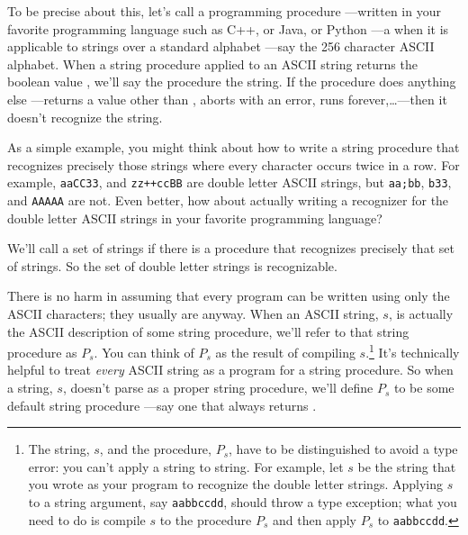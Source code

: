To be precise about this, let's call a programming procedure
---written in your favorite programming language such as C++, or Java, or
Python ---a  when it is applicable to strings
over a standard alphabet ---say the 256 character ASCII alphabet.
When a string procedure applied to an ASCII string returns the boolean
value \True, we'll say the procedure  the string.  If
the procedure does anything else ---returns a value other than \True,
aborts with an error, runs forever,\dots ---then it doesn't recognize
the string.

As a simple example, you might think about how to write a string
procedure that recognizes precisely those  strings
where every character occurs twice in a row.  For example,
\texttt{aaCC33}, and \texttt{zz++ccBB} are double letter ASCII
strings, but \texttt{aa;bb}, \texttt{b33}, and \texttt{AAAAA} are not.
Even better, how about actually writing a recognizer for the double
letter ASCII strings in your favorite programming language?

We'll call a set of strings  if there is a
procedure that recognizes precisely that set of strings.  So the set
of double letter strings is recognizable.

There is no harm in assuming that every program can be written using
only the ASCII characters; they usually are anyway.  When an ASCII
string, $s$, is actually the ASCII description of some string
procedure, we'll refer to that string procedure as $P_s$.  You can
think of $P_s$ as the result of compiling $s$.\footnote{The string,
  $s$, and the procedure, $P_s$, have to be distinguished to avoid a
  type error: you can't apply a string to string.  For example, let
  $s$ be the string that you wrote as your program to recognize the
  double letter strings.  Applying $s$ to a string argument, say
  \texttt{aabbccdd}, should throw a type exception; what you need to
  do is compile $s$ to the procedure $P_s$ and then apply $P_s$ to
  \texttt{aabbccdd}.  \iffalse This should result in a returned value
  \True, since \texttt{aabbccdd} is a double letter string.\fi }
It's technically helpful to treat \emph{every} ASCII string as a
program for a string procedure.  So when a string, $s$, doesn't parse
as a proper string procedure, we'll define $P_s$ to be some default
string procedure ---say one that always returns \False.  \iffalse So
$s$ is an ill-formed string, $P_S$ will be a recognizer for the empty
set of strings.  \fi

